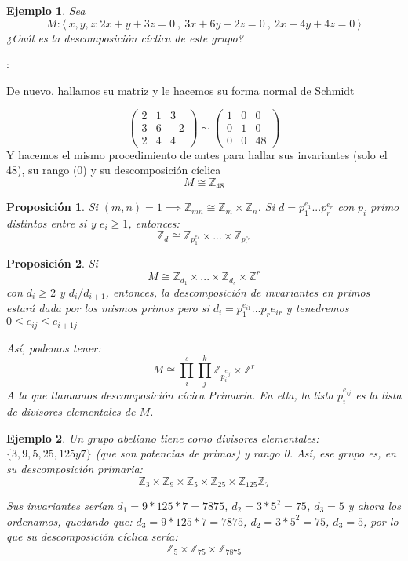 \documentclass[11pt, a4paper, titlepage]{article}
\makeatletter
\newif\IfInSansMode
\let\oldsf\sffamily
\renewcommand*{\sffamily}{\oldsf\mathversion{sans}\InSansModetrue}
\let\oldnorm\normalfont
\renewcommand*{\normalfont}{\oldnorm\InSansModefalse\mathversion{normal}}
\renewenvironment{proof}[1][\proofname] {\vspace{-15pt}\par\pushQED{\qed}\normalfont\topsep6\p@\@plus6\p@\relax\trivlist\item[\hskip\labelsep\it#1\@addpunct{.}]\ignorespaces}{\popQED\endtrivlist\@endpefalse}
\providecommand{\ent}{\mathbb{Z}}
\renewenvironment{proof}[1][\proofname] {\par\pushQED{\qed}\normalfont\topsep6\p@\@plus6\p@\relax\trivlist\item[\hskip\labelsep\itshape\sffamily#1\@addpunct{.}]\ignorespaces}{\popQED\endtrivlist\@endpefalse}
\theoremstyle{theorem-style}
\newtheorem{nprop}{Proposición}[section]
\theoremstyle{definition-style}
\theoremstyle{remark-style}
\theoremstyle{example-style}
\newtheorem{ejemplo}{Ejemplo}[section]
\makeatother
\begin{document}
\begin{ejemplo}
	Sea
	\[
	M: \langle \ x,y,z :  2x+y+3z = 0  \ , \ 3x+6y-2z = 0 \ , \ 2x+4y+4z = 0 \ \rangle
	\]
	¿Cuál es la descomposición cíclica de este grupo?
\end{ejemplo}
\begin{proof}[Solución]:

De nuevo, hallamos su matriz y le hacemos su forma normal de Schmidt

\[
	\begin{pmatrix}
 2& 1  & 3 \\
 3 & 6 & -2 \\
 2 & 4 & 4
\end{pmatrix}  \sim 	\begin{pmatrix}
 1 & 0 & 0 \\
 0 & 1 & 0 \\
 0 & 0 & 48
\end{pmatrix}
\]
Y hacemos el mismo procedimiento de antes para hallar sus invariantes (solo el 48), su rango (0) y su descomposición cíclica
\[
M \cong \ent_{48}
\]


\end{proof}

\begin{nprop}
	Si $(m,n) = 1 \implies \ent_{mn} \cong \ent_m \times \ent_n$.
Si $d = p_1^{e_1}...p_r^{e_r}$ con $p_i$ primo distintos entre sí y $e_i \geq 1$, entonces:
\[
\ent_d \cong \ent_{p_1^{e_1}} \times ... \times \ent_{p_r^{e_r}}
\]
\end{nprop}

\begin{nprop}
	Si
	\[
	M \cong \ent_{d_1} \times ... \times \ent_{d_s} \times \ent^r
	\]
	con $d_i \geq 2 $ y $d_i / d_{i+1}$, entonces, la descomposición de invariantes en primos estará dada por los mismos primos pero si $d_i = p_1^{e_{i1}}...p_r{e_{ir}}$ y tenedremos $0 \leq e_{ij} \leq e_{i+1j}$

	Así, podemos tener:
	\[
	M \cong \prod_i^s \prod_j ^k \ent_{p_i^{e_{ij}}} \times \ent^r
	\]
	A la que llamamos descomposición cícica Primaria. En ella, la lista ${p_i^{e_{ij}}}$ es la lista de divisores elementales de $M$.
\end{nprop}
\begin{ejemplo}
	Un grupo abeliano tiene como divisores elementales: $\{3,9,5,25,125 y 7\} $ (que son potencias de primos) y rango 0. Así, ese grupo es, en su descomposición primaria:
	\[
	\ent_3 \times \ent_9 \times \ent_5 \times \ent_{25} \times \ent_{125} \ent_7
	\]

Sus invariantes serían $d_1 = 9*125*7 = 7875$, $d_2 = 3*5^2 = 75$, $d_3 = 5$ y ahora los ordenamos, quedando que: $d_3 = 9*125*7 = 7875$, $d_2 = 3*5^2 = 75$, $d_3 = 5$, por lo que su descomposición cíclica sería:
\[
\ent_5 \times \ent_{75} \times \ent_{7875}
\]
\end{ejemplo}
\end{document}
